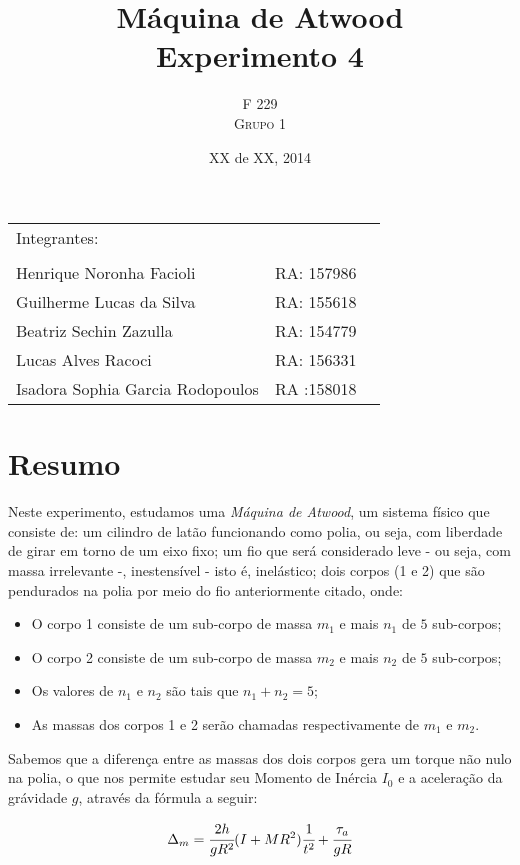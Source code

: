 \documentclass[a4paper]{article}
\title{Máquina de Atwood \\ Experimento 4} %
\author{F 229 \\ \textsc{Grupo 1}}
\date{XX de XX, 2014}
\begin{document}
\maketitle

\begin{center}
	\begin{tabular}{l r l}
		Integrantes:\\\\
		 Henrique Noronha Facioli & RA: 157986 \\
		 Guilherme Lucas da Silva & RA: 155618 \\
		 Beatriz Sechin Zazulla & RA: 154779 \\
		 Lucas Alves Racoci & RA: 156331 \\
		 Isadora Sophia Garcia Rodopoulos & RA :158018 \\
	\end{tabular}
\end{center}

\newpage{}

\section{Resumo}
Neste experimento, estudamos uma \emph{Máquina de Atwood}, um sistema físico que consiste de: um cilindro de latão funcionando como polia, ou seja, com liberdade de girar em torno de um eixo fixo; um fio que será considerado leve - ou seja, com massa irrelevante -, inestensível - isto é, inelástico; dois corpos (1 e 2) que são pendurados na polia por meio do fio anteriormente citado, onde:
\begin{itemize} 
	\item O corpo 1 consiste de um sub-corpo de massa ${m}_{1}$ e mais $n_{1}$ de $5$ sub-corpos; 
	\item O corpo 2 consiste de um sub-corpo de massa ${m}_{2}$ e mais $n_{2}$ de $5$ sub-corpos; 
	\item Os valores de $n_{1}$ e $n_{2}$ são tais que $n_{1}+n_{2}=5$; 
	\item As massas dos corpos 1 e 2 serão chamadas respectivamente de $m_{1}$ e $m_{2}$.
\end {itemize} 

Sabemos que a diferença entre as massas dos dois corpos gera um torque não nulo na polia, o que nos permite estudar seu Momento de Inércia $I_{0}$ e a aceleração da grávidade $g$, através da fórmula a seguir:

\begin{align}
\Delta_m=\cfrac{2h}{gR^{2}}(I+MR^{2})\ensuremath{\cfrac{1}{t^{2}}}+\cfrac{\tau_{a}}{gR}
\end{align}
\end{document}
